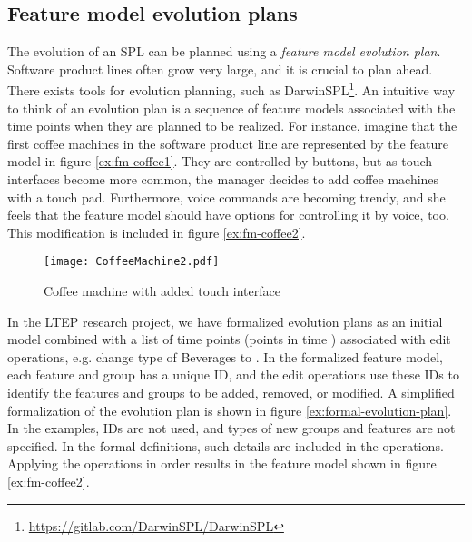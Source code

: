 \subsection{Feature model evolution plans}
\label{sub:feature-model-evolution-plans}
The evolution of an SPL can be planned using a \emph{feature model evolution plan}. Software product lines often grow very large, and it is crucial to plan ahead. There exists tools for evolution planning, such as DarwinSPL\footnote{\url{https://gitlab.com/DarwinSPL/DarwinSPL}}. An intuitive way to think of an evolution plan is a sequence of feature models associated with the time points when they are planned to be realized. For instance, imagine that the first coffee machines in the software product line are represented by the feature model in figure \vref{ex:fm-coffee1}. They are controlled by buttons, but as touch interfaces become more common, the manager decides to add coffee machines with a touch pad. Furthermore, voice commands are becoming trendy, and she feels that the feature model should have options for controlling it by voice, too. This modification is included in figure \vref{ex:fm-coffee2}.

\begin{figure}
   \begin{center}
      \texttt{[image: CoffeeMachine2.pdf]}
   \end{center}
   \caption[Coffee machine with added touch interface]{Coffee machine with added touch interface \footnotemark}
   \label{ex:fm-coffee2}
\end{figure}


In the LTEP research project, we have formalized evolution plans as an initial model combined with a list of time points (points in time ) associated with edit operations, e.g. change type of Beverages to \optional{}. In the formalized feature model, each feature and group has a unique ID, and the edit operations use these IDs to identify the features and groups to be added, removed, or modified. A simplified formalization of the evolution plan is shown in figure \vref{ex:formal-evolution-plan}. In the examples, IDs are not used, and types of new groups and features are not specified. In the formal definitions, such details are included in the operations. Applying the operations in order results in the feature model shown in figure \vref{ex:fm-coffee2}.

